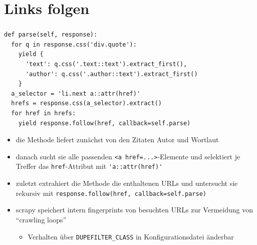 \documentclass{beamer}
\begin{document}
\begin{frame}
\end{frame}







\section{Links folgen}
\begin{frame}
	\frametitle{\insertsection{}}
	\begin{lstlisting}
def parse(self, response):
  for q in response.css('div.quote'):
    yield {
      'text': q.css('.text::text').extract_first(),
      'author': q.css('.author::text').extract_first()
    }
  a_selector = 'li.next a::attr(href)'
  hrefs = response.css(a_selector).extract()  
  for href in hrefs:    
    yield response.follow(href, callback=self.parse)
	\end{lstlisting}
	\begin{itemize}
		\item die Methode liefert zunächst von den Zitaten Autor und Wortlaut
		\item danach sucht sie alle passenden \lstinline|<a href=...>|-Elemente und selektiert je Treffer das \lstinline|href|-Attribut mit \lstinline|'a::attr(href)'| 
		
		\framebreak
		

		\item zuletzt extrahiert die Methode die enthaltenen URLs und untersucht sie rekursiv mit \lstinline|response.follow(href, callback=self.parse)| 
		\item scrapy speichert intern fingerprints von besuchten URLs zur Vermeidung von ``crawling loops'' \begin{itemize}
			\item Verhalten über \lstinline|DUPEFILTER_CLASS| in Konfigurationsdatei änderbar
		\end{itemize}
	\end{itemize}
\end{frame}
\end{document}
